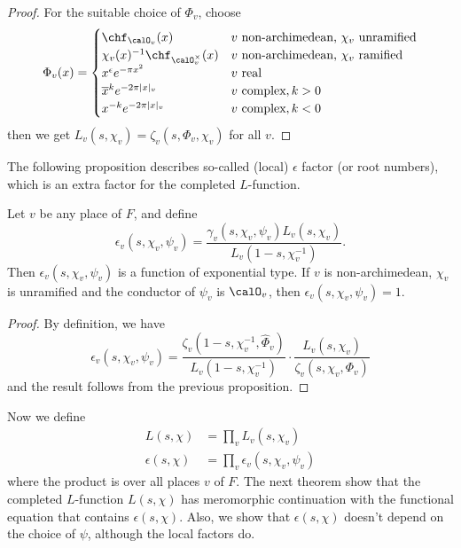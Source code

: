 \begin{proof}
For the suitable choice of $\Phi_{v}$, choose
\begin{align*}
\Phi_{v}(x) = \begin{cases} \chf_{\calO_{v}}(x) & v\text{ non-archimedean, $\chi_{v}$ unramified} \\
\chi_{v}(x)^{-1} \chf_{\calO_{v}^{\times}}(x) & v\text{ non-archimedean, $\chi_{v}$ ramified} \\
x^{\epsilon}e^{-\pi x^{2}} & v \text{ real} \\
\overline{x}^{k} e^{-2\pi |x|_{v}} & v\text{ complex}, k>0 \\
x^{-k} e^{-2\pi |x|_{v}} & v \text{ complex}, k<0
\end{cases}
\end{align*}
then we get $L_{v}(s, \chi_{v}) = \zeta_{v}(s, \Phi_{v}, \chi_{v})$ for all $v$. 
\end{proof}



The following proposition describes so-called (local) $\epsilon$ factor (or root numbers), which is an extra factor for the completed $L$-function. 
\begin{proposition}
Let $v$ be any place of $F$, and define 
$$
\epsilon_{v}(s, \chi_{v}, \psi_{v}) = \frac{\gamma_{v}(s, \chi_{v}, \psi_{v})L_{v}(s, \chi_{v})}{L_{v}(1-s, \chi_{v}^{-1})}.
$$
Then $\epsilon_{v}(s, \chi_{v}, \psi_{v})$ is a function of exponential type. 
If  $v$ is non-archimedean, $\chi_{v}$ is unramified and the conductor of $\psi_{v}$ is $\calO_{v}$, then $\epsilon_{v}(s, \chi_{v}, \psi_{v}) = 1$. 
\end{proposition}

\begin{proof}
By definition, we have
$$
\epsilon_{v}(s, \chi_{v}, \psi_{v}) = \frac{\zeta_{v}(1-s, \chi_{v}^{-1}, \widehat{\Phi}_{v})}{L_{v}(1-s, \chi_{v}^{-1})} \cdot \frac{L_{v}(s, \chi_{v})}{\zeta_{v}(s, \chi_{v}, \Phi_{v})} 
$$
and the result follows from the previous proposition. 
\end{proof}

Now we define
\begin{align*}
L(s, \chi) &= \prod_{v} L_{v}(s, \chi_{v}) \\
\epsilon(s, \chi) &= \prod_{v} \epsilon_{v}(s, \chi_{v}, \psi_{v})
\end{align*}
where the product is over all places $v$ of $F$. 
The next theorem show that the completed $L$-function $L(s, \chi)$ has meromorphic continuation with the functional equation that contains $\epsilon(s, \chi)$. Also, we show that $\epsilon(s, \chi)$ doesn't depend on the choice of $\psi$, although the local factors do. 


